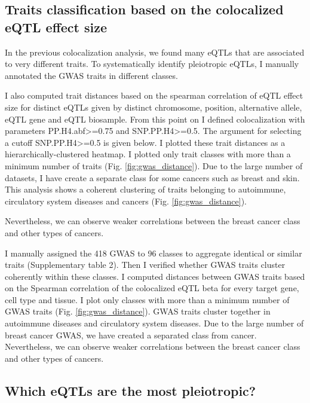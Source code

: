 \subsection*{Traits classification based on the colocalized eQTL effect size}

In the previous colocalization analysis, we found many eQTLs that are associated to very different traits.
%
To systematically identify pleiotropic eQTLs, I manually annotated the GWAS traits in different classes.

I also computed trait distances based on the spearman correlation of eQTL effect size for distinct eQTLs given by
distinct chromosome, position, alternative allele, eQTL gene and eQTL biosample.
%
From this point on I defined colocalization with parameters PP.H4.abf>=0.75 and SNP.PP.H4>=0.5.
%
The argument for selecting a cutoff SNP.PP.H4>=0.5 is given below.
%
I plotted these trait distances as a hierarchically-clustered heatmap.
%
I plotted only trait classes with more than a minimum number of traits (Fig. \ref{fig:gwas_distance}).
%
Due to the large number of datasets, I have create a separate class for some cancers such as breast and skin.
%
This analysis shows a coherent clustering of traits belonging to autoimmune, circulatory system diseases and cancers (Fig. \ref{fig:gwas_distance}).
%

Nevertheless, we can observe weaker correlations between the breast cancer class and other types of cancers.

I manually assigned the 418 GWAS to 96 classes to aggregate identical or similar traits (Supplementary table 2).
%
Then I verified whether GWAS traits cluster coherently within these classes.
%
I computed distances between GWAS traits based on the Spearman correlation of the colocalized eQTL beta for every target gene, cell type and tissue.
%
I plot only classes with more than a minimum number of GWAS traits (Fig. \ref{fig:gwas_distance}).
%
GWAS traits cluster together in autoimmune diseases and circulatory system diseases.
%
Due to the large number of breast cancer GWAS, we have created a separated class from cancer.
Nevertheless, we can observe weaker correlations between the breast cancer class and other types of cancers.

\subsection*{Which eQTLs are the most pleiotropic?}

